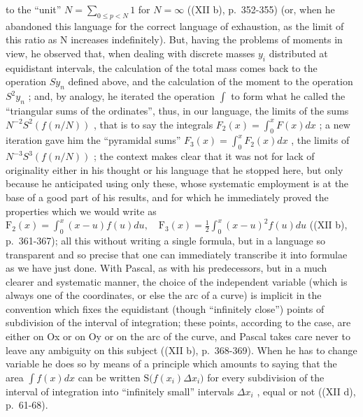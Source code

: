 to the ``unit'' \(N = \sum_{0 \leqslant p < N} 1\) for \(N = \infty\) ((XII b), p.~352-355) (or, when he abandoned this language for the correct language of exhaustion, as the limit of this ratio as N increases indefinitely). But, having the problems of moments in view, he observed that, when dealing with discrete masses \(y_i\) distributed at equidistant intervals, the calculation of the total mass comes back to the operation \(Sy_n\) defined above, and the calculation of the moment to the operation \(S^2 y_n\) ; and, by analogy, he iterated the operation \(\int\) to form what he called the ``triangular sums of the ordinates'', thus, in our language, the limits of the sums \(N^{-2} S^2(f(n/N))\) , that is to say the integrals \(F_2(x) = \int_0^x F(x) dx\) ; a new iteration gave him the ``pyramidal sums'' \(F_3(x) = \int_0^x F_2(x) dx\) , the limits of \(N^{-3} S^3(f(n/N))\) ; the context makes clear that it was not for lack of originality either in his thought or his language that he stopped here, but only because he anticipated using only these, whose systematic employment is at the base of a good part of his results, and for which he immediately proved the properties which we would write as \(\mathrm{F}_{2}(x)=\int_{0}^{x}(x-u)f(u)du,\quad\mathrm{F}_{3}(x)=\frac{1}{2}\int_{0}^{x}(x-u)^{2}f(u)du\) ((XII b), p.~361-367); all this without writing a single formula, but in a language so transparent and so precise that one can immediately transcribe it into formulae as we have just done. With Pascal, as with his predecessors, but in a much clearer and systematic manner, the choice of the independent variable (which is always one of the coordinates, or else the arc of a curve) is implicit in the convention which fixes the equidistant (though ``infinitely close'') points of subdivision of the interval of integration; these points, according to the case, are either on Ox or on Oy or on the arc of the curve, and Pascal takes care never to leave any ambiguity on this subject ((XII b), p.~368-369). When he has to change variable he does so by means of a principle which amounts to saying that the area \(\int f(x)dx\) can be written \(\mathrm{S}\big(f(x_{i})\Delta x_{i}\big)\) for every subdivision of the interval of integration into ``infinitely small'' intervals \(\Delta x_{i}\) , equal or not ((XII d), p.~61-68).

